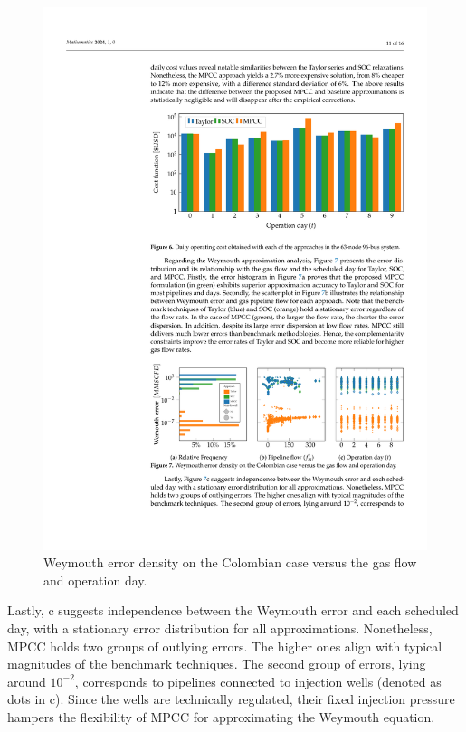 \begin{figure}[H]
   \includegraphics[scale=0.98]{figures/Chapter_MPCC/g006.pdf}
\caption{Weymouth error density on the Colombian case versus the gas flow and operation day.}\label{fig:red_test_error}
\end{figure}

Lastly, c suggests independence between the Weymouth error and each scheduled day, with a stationary error distribution for all approximations. Nonetheless, MPCC holds two groups of outlying errors. The higher ones align with typical magnitudes of the benchmark techniques. The second group of errors, lying around $10^{-2}$, corresponds to pipelines connected to injection wells (denoted as dots in c). Since the wells are technically regulated, their fixed injection pressure hampers the flexibility of MPCC for approximating the Weymouth equation.

